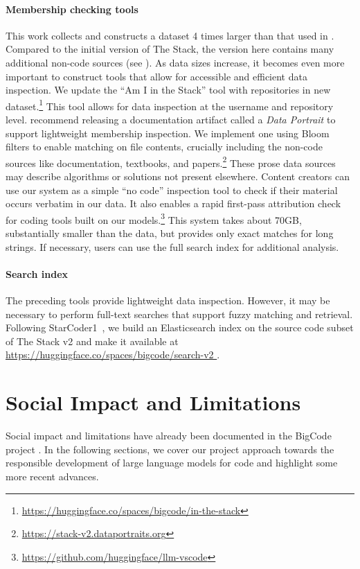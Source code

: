 \documentclass[10pt]{article} %
\begin{document}
\paragraph{Membership checking tools} This work collects and constructs a dataset 4 times larger than that used in \starcoderbase{}.
Compared to the initial version of The Stack, the version here contains many additional non-code sources (see ).
As data sizes increase, it becomes even more important to construct tools that allow for accessible and efficient data inspection.
We update the ``Am I in the Stack'' tool with repositories in new dataset.\footnote{\url{https://huggingface.co/spaces/bigcode/in-the-stack}} 
This tool allows for data inspection at the username and repository level. 
\citet{marone2023data} recommend releasing a documentation artifact called a \emph{Data Portrait} to support lightweight membership inspection. 
We implement one using Bloom filters to enable matching on file contents, crucially including the non-code sources like documentation, textbooks, and papers.\footnote{\url{https://stack-v2.dataportraits.org}}
These prose data sources may describe algorithms or solutions not present elsewhere. 
Content creators can use our system as a simple ``no code'' inspection tool to check if their material occurs verbatim in our data.
It also enables a rapid first-pass attribution check for coding tools built on our models.\footnote{\url{https://github.com/huggingface/llm-vscode}}
This system takes about 70GB, substantially smaller than the data, but provides only exact matches for long strings. 
If necessary, users can use the full search index for additional analysis.

\paragraph{Search index}
The preceding tools provide lightweight data inspection. However, it may be necessary to perform full-text searches that support fuzzy matching and retrieval. Following StarCoder1~\citep{li2023starcoder}, we build an Elasticsearch index on the source code subset of The Stack v2 and make it available at \url{https://huggingface.co/spaces/bigcode/search-v2
}. 

\section{Social Impact and Limitations}

Social impact and limitations have already been documented in the BigCode project \citep{kocetkov2023stack, allal2023santacoder, li2023starcoder, bigcodecollaboration2023bigcode}. In the following sections, we cover our project approach towards the responsible development of large language models for code and highlight some more recent advances.
\end{document}
